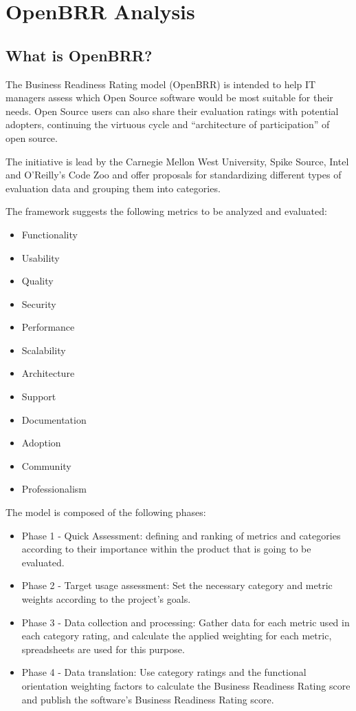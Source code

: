 \documentclass[a4paper,12pt]{book}
\begin{document}

\chapter{OpenBRR Analysis}
\label{chap:openbrr}

\section{What is OpenBRR?}
\label{sec:openbrr2}

The Business Readiness Rating model (OpenBRR)\cite{OpenBRRWhitepaper} is
intended to help IT managers assess which Open Source software would be most suitable for their needs. Open Source users can also share their evaluation ratings with potential adopters, continuing the virtuous cycle and “architecture of participation” of open
source.

The initiative is lead by the Carnegie Mellon West University, Spike Source,
Intel and O’Reilly’s Code Zoo and offer proposals for standardizing different
types of evaluation data and grouping them into categories.

The framework suggests the following metrics to be analyzed and evaluated:
\begin{itemize}
\item Functionality
\item Usability
\item Quality
\item Security
\item Performance
\item Scalability
\item Architecture
\item Support
\item Documentation
\item Adoption
\item Community
\item Professionalism
\end{itemize}

The model is composed of the following phases:
\begin{itemize}
\item Phase 1 - Quick Assessment: defining and ranking of metrics and categories
according to their importance within the product that is going to be evaluated.
\item Phase 2 - Target usage assessment: Set the necessary category and metric
weights according to the project's goals.
\item Phase 3 - Data collection and processing: Gather data for each metric used
in each category rating, and calculate the applied weighting for each metric,
spreadsheets are used for this purpose.
\item Phase 4 - Data translation: Use category ratings and the functional
orientation weighting factors to calculate the Business Readiness Rating score
and publish the software’s Business Readiness Rating score.
\end{itemize}
\end{document}
